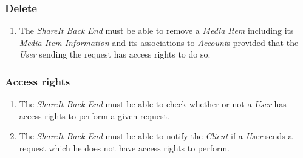 \subsubsection{Delete}
\begin{enumerate}[label=FR-\twodigits*,resume]

\item The \textit{ShareIt Back End} must be able to remove a \textit{Media Item} including its \textit{Media Item Information} and its associations to \textit{Account}s provided that the \textit{User} sending the request has access rights to do so.

\end{enumerate}

\subsubsection{Access rights}
\begin{enumerate}[label=FR-\twodigits*,resume]

\item The \textit{ShareIt Back End} must be able to check whether or not a \textit{User} has access rights to perform a given request.

\item The \textit{ShareIt Back End} must be able to notify the \textit{Client} if a \textit{User} sends a request which he does not have access rights to perform.

\end{enumerate}

%
